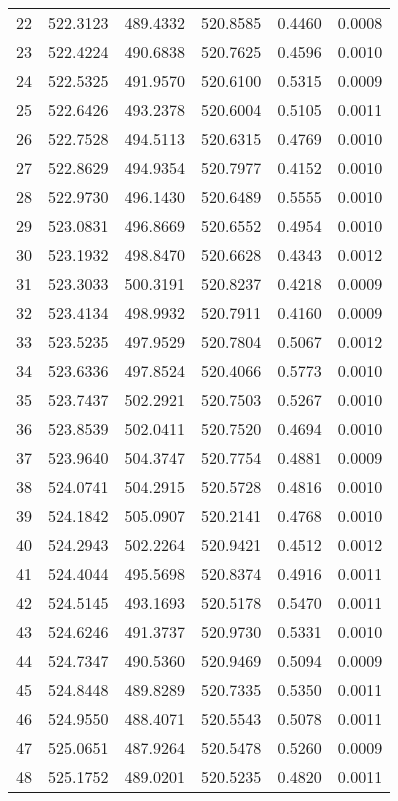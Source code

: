 \documentclass{article}
\begin{document}
\begin{longtable}{|c|c|c|c|c|c|}
22 & 522.3123 & 489.4332 & 520.8585 & 0.4460 & 0.0008 \\
23 & 522.4224 & 490.6838 & 520.7625 & 0.4596 & 0.0010 \\
24 & 522.5325 & 491.9570 & 520.6100 & 0.5315 & 0.0009 \\
25 & 522.6426 & 493.2378 & 520.6004 & 0.5105 & 0.0011 \\
26 & 522.7528 & 494.5113 & 520.6315 & 0.4769 & 0.0010 \\
27 & 522.8629 & 494.9354 & 520.7977 & 0.4152 & 0.0010 \\
28 & 522.9730 & 496.1430 & 520.6489 & 0.5555 & 0.0010 \\
29 & 523.0831 & 496.8669 & 520.6552 & 0.4954 & 0.0010 \\
30 & 523.1932 & 498.8470 & 520.6628 & 0.4343 & 0.0012 \\
31 & 523.3033 & 500.3191 & 520.8237 & 0.4218 & 0.0009 \\
32 & 523.4134 & 498.9932 & 520.7911 & 0.4160 & 0.0009 \\
33 & 523.5235 & 497.9529 & 520.7804 & 0.5067 & 0.0012 \\
34 & 523.6336 & 497.8524 & 520.4066 & 0.5773 & 0.0010 \\
35 & 523.7437 & 502.2921 & 520.7503 & 0.5267 & 0.0010 \\
36 & 523.8539 & 502.0411 & 520.7520 & 0.4694 & 0.0010 \\
37 & 523.9640 & 504.3747 & 520.7754 & 0.4881 & 0.0009 \\
38 & 524.0741 & 504.2915 & 520.5728 & 0.4816 & 0.0010 \\
39 & 524.1842 & 505.0907 & 520.2141 & 0.4768 & 0.0010 \\
40 & 524.2943 & 502.2264 & 520.9421 & 0.4512 & 0.0012 \\
41 & 524.4044 & 495.5698 & 520.8374 & 0.4916 & 0.0011 \\
42 & 524.5145 & 493.1693 & 520.5178 & 0.5470 & 0.0011 \\
43 & 524.6246 & 491.3737 & 520.9730 & 0.5331 & 0.0010 \\
44 & 524.7347 & 490.5360 & 520.9469 & 0.5094 & 0.0009 \\
45 & 524.8448 & 489.8289 & 520.7335 & 0.5350 & 0.0011 \\
46 & 524.9550 & 488.4071 & 520.5543 & 0.5078 & 0.0011 \\
47 & 525.0651 & 487.9264 & 520.5478 & 0.5260 & 0.0009 \\
48 & 525.1752 & 489.0201 & 520.5235 & 0.4820 & 0.0011 \\

\end{longtable}
\end{document}
